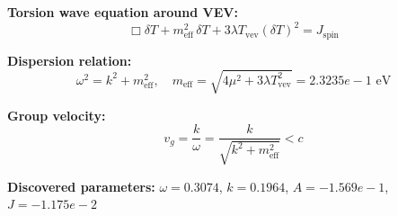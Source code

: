 
\textbf{Torsion wave equation around VEV:}
\begin{equation}
  \Box \delta T + m_{\text{eff}}^2 \, \delta T + 3\lambda T_{\text{vev}} (\delta T)^2 = J_{\text{spin}}
\end{equation}

\textbf{Dispersion relation:}
\begin{equation}
  \omega^2 = k^2 + m_{\text{eff}}^2, \quad
  m_{\text{eff}} = \sqrt{4\mu^2 + 3\lambda T_{\text{vev}}^2} = 2.3235e-1 \text{ eV}
\end{equation}

\textbf{Group velocity:}
\begin{equation}
  v_g = \frac{k}{\omega} = \frac{k}{\sqrt{k^2 + m_{\text{eff}}^2}} < c
\end{equation}

\textbf{Discovered parameters:}
$\omega = 0.3074$, \quad
$k = 0.1964$, \quad
$A = -1.569e-1$, \quad
$J = -1.175e-2$